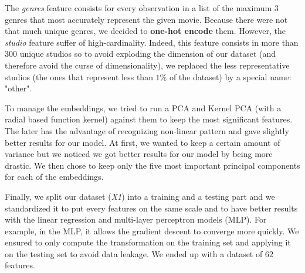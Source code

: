 The \textit{genres} feature consists for every observation in a list of the maximum $3$ genres that most accurately represent the given movie. Because there were not that much unique genres, we decided to \textbf{one-hot encode} them. However, the \textit{studio} feature suffer of high-cardinality. Indeed, this feature consists in more than $300$ unique studios so to avoid exploding the dimension of our dataset (and therefore avoid the curse of dimensionality), we replaced the less representative studios (the ones that represent less than $1\%$ of the dataset) by a special name: "other". 

To manage the embeddings, we tried to run a PCA and Kernel PCA (with a radial based function kernel) against them to keep the most significant features. The later has the advantage of recognizing non-linear pattern and gave slightly better results for our model. At first, we wanted to keep a certain amount of variance but we noticed we got better results for our model by being more drastic. We then chose to keep only the five most important principal components for each of the embeddings.

Finally, we split our dataset (\textit{X1}) into a training and a testing part and we standardized it to put every features on the same scale and to have better results with the linear regression and multi-layer perceptron models (MLP). For example, in the MLP, it allows the gradient descent to converge more quickly. We ensured to only compute the transformation on the training set and applying it on the testing set to avoid data leakage.
We ended up with a dataset of $62$ features.